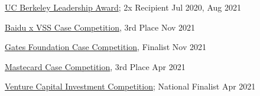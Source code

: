 \href{https://alumni.berkeley.edu/community/scholarships/leadership-award}{UC Berkeley Leadership Award}; 2x Recipient \hfill Jul 2020, Aug 2021 \par
\href{https://www.facebook.com/events/1218686891977031}{Baidu x VSS Case Competition}, 3rd Place \hfill Nov 2021\par
\href{https://www.facebook.com/events/833366260673950}{Gates Foundation Case Competition}, Finalist \hfill Nov 2021\par
\href{https://www.facebook.com/groups/892224561557976}{Mastecard Case Competition}, 3rd Place \hfill Apr 2021\par
\href{https://www.vcic.org/}{Venture Capital Investment Competition}; National Finalist \hfill Apr 2021\par